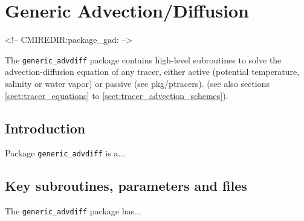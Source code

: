 

\section{Generic Advection/Diffusion}
\label{sec:pkg:gad}
\begin{rawhtml}
<!-- CMIREDIR:package_gad: -->
\end{rawhtml}

The {\tt generic\_advdiff} package contains high-level
subroutines to solve the advection-diffusion equation
of any tracer, either active (potential temperature,
salinity or water vapor) or passive (see pkg/ptracers).
(see also sections \ref{sect:tracer_equations} to
\ref{sect:tracer_advection_schemes}).


\subsection{Introduction}
Package {\tt generic\_advdiff} is a...


\subsection{Key subroutines, parameters and files}
\label{sec:pkg:rw:implementation_synopsis}
The {\tt generic\_advdiff} package has... 


